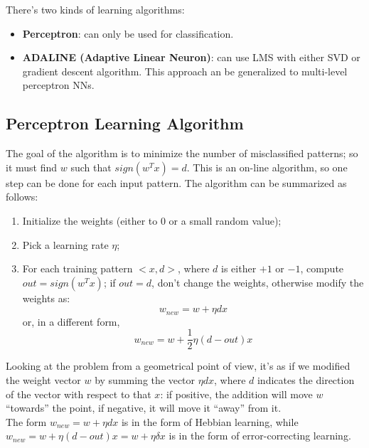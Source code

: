 There's two kinds of learning algorithms:
\begin{itemize}
    \item \textbf{Perceptron}: can only be used for classification.
    \item \textbf{ADALINE (Adaptive Linear Neuron)}: can use LMS with either SVD or gradient descent algorithm. This approach an be generalized to multi-level perceptron NNs.
\end{itemize}

\subsection{Perceptron Learning Algorithm}

The goal of the algorithm is to minimize the number of misclassified patterns; so it must find $w$ such that $sign(w^Tx)=d$. This is an on-line algorithm, so one step can be done for each input pattern. The algorithm can be summarized as follows:

\begin{enumerate}
    \item Initialize the weights (either to 0 or a small random value);

    \item Pick a learning rate $\eta$;

    \item For each training pattern $<x,d>$, where $d$ is either $+1$ or $-1$, compute $out = sign(w^Tx)$; if $out = d$, don't change the weights, otherwise modify the weights as:
    \begin{equation*}
        w_{new} = w + \eta d x
    \end{equation*}
    or, in a different form,
    \begin{equation*}
        w_{new} = w + \frac{1}{2} \eta (d-out) x
    \end{equation*}
\end{enumerate}

Looking at the problem from a geometrical point of view, it's as if we modified the weight vector $w$ by summing the vector $\eta d x$, where $d$ indicates the direction of the vector with respect to that $x$: if positive, the addition will move $w$ ``towards'' the point, if negative, it will move it ``away'' from it. \\
The form $w_{new} = w + \eta d x$ is in the form of Hebbian learning, while $w_{new} = w + \eta (d-out) x = w + \eta \delta x$ is in the form of error-correcting learning.

